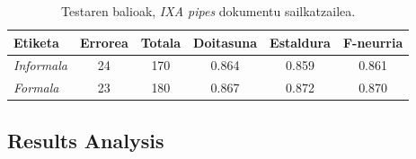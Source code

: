 \documentclass[information,article,submit,moreauthors,pdftex,10pt,a4paper]{Definitions/mdpi}
\begin{document}
\begin{table}[H]
  \centering
  \begin{tabular}{|l|c|c|c|c|c|}
    \hline
    \textbf{Etiketa} & \textbf{Errorea} & \textbf{Totala} & \textbf{Doitasuna} & \textbf{Estaldura} & \textbf{F-neurria}\\ \hline 
    \textit{Informala} &  24 & 170 & 0.864  & 0.859  & 0.861\\ \hline 
    \textit{Formala} &  23 & 180 & 0.867 & 0.872 & 0.870\\ \hline
  \end{tabular}
  \caption{Testaren balioak, \textit{IXA pipes} dokumentu sailkatzailea.}
  \label{tab:ixa-ml-test}
\end{table}

\subsection{Results Analysis}\label{sec:sail ond}
\end{document}

